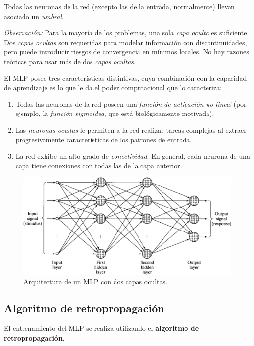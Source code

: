 \documentclass[10pt,a4paper]{article}
\begin{document}
Todas las neuronas de la red (excepto las de la entrada, normalmente) llevan asociado un \textit{umbral}.

\textit{Observación:} Para la mayoría de los problemas, una sola \textit{capa oculta} es suficiente. Dos \textit{capas ocultas} son requeridas para modelar información con discontinuidades, pero puede introducir riesgos de convergencia en mínimos locales. No hay razones teóricas para usar más de dos \textit{capas ocultas}.

El MLP posee tres características distintivas, cuya combinación con la capacidad de aprendizaje es lo que le da el poder computacional que lo caracteriza:
\begin{enumerate}
\item Todas las neuronas de la red poseen una \textit{función de activación no-lineal} (por ejemplo, la \textit{función sigmoidea}, que está biológicamente motivada).
\item Las \textit{neuronas ocultas} le permiten a la red realizar tareas complejas al extraer progresivamente características de los patrones de entrada.
\item La red exhibe un alto grado de \textit{conectividad}. En general, cada neurona de una capa tiene conexiones con todas las de la capa anterior.
\end{enumerate}

\begin{figure}[ht!]
  \caption{Arquitectura de un MLP con dos capas ocultas.}
  \label{fig:mlp}
  \centerline{\includegraphics[width=0.9\textwidth-\fboxrule-\fboxrule]{imgs/mlp.png}}
\end{figure}

\subsection{Algoritmo de retropropagación}

El entrenamiento del MLP se realiza utilizando el \textbf{algoritmo de retropropagación}.
\end{document}

